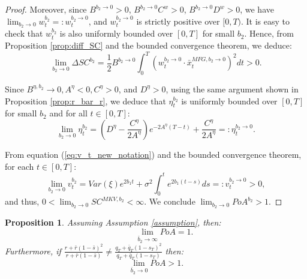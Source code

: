 \documentclass[11pt]{article}
\newtheorem{proposition}{Proposition}
\begin{document}
\begin{proof}
	
	Moreover, since $B^{b_2 \to 0}>0$, $B^{b_2 \to 0}C^w >0$, $B^{b_2\to 0}D^w > 0$, we have $\lim_{b_2 \to 0} w_t^{b_2}=:w_t^{b_2 \to 0}$, and $w_t^{b_2 \to 0}$ is strictly positive over $[0,T)$. It is easy to check that $w_t^{b_2}$ is also uniformly bounded over $[0,T]$ for small $b_2$. Hence, from Proposition \ref{prop:diff_SC} and the bounded convergence theorem, we deduce:
	\begin{equation*}
	\lim_{b_2 \to 0} \Delta SC^{b_2} = \frac{1}{2} B^{b_2\to 0} \int_0^T (w_t^{b_2 \to 0} \cdot \bar{x}_t^{MFG,b_2 \to 0})^2 dt >0.
	\end{equation*}
	
	
	Since $B^{\eta,b_2} \to 0, A^{\eta} < 0, C^{\eta} >0$, and $D^{\eta} > 0$, using the same argument shown in Proposition \ref{prop:r_bar_r}, 
	we deduce that $\eta_t^{b_2}$ is uniformly bounded over $[0,T]$ for small $b_2$ and for all $t \in[0,T]$:
	$$\lim_{b_2 \to 0}\eta_t^{b_2}=\left(D^{\eta} - \frac{C^{\eta}}{2A^\eta}\right) e^{-2A^\eta(T-t)} + \frac{C^\eta}{2A^{\eta} }=:\eta_t^{b_2 \to 0}.$$
	
	From equation (\ref{eq:v_t_new_notation}) and the bounded convergence theorem, for each $t \in [0,T]$:
	$$ \lim_{b_2 \to 0}v_t^{b_2}=Var(\xi) e^{2b_1 t} + \sigma^2 \int_0^t e^{2b_1 (t-s)} ds=:v_t^{b_2 \to 0}>0,$$
	and thus, $ 0 < \lim_{b_2 \to 0} SC^{MKV,b_2} < \infty.$ We conclude $\lim_{b_2 \to 0} PoA^{b_2} > 1.$
\end{proof}


\begin{proposition}
	Assuming Assumption \ref{assumption}, then:
	$$ \qquad\lim_{\bar{b}_2 \to \infty} PoA = 1.$$
	Furthermore, if	$\frac{r + \bar{r}(1- \bar{s})^2}{r + \bar{r}(1-\bar{s})} \neq \frac{q_T+\bar{q}_T(1-s_T)^2}{q_T+\bar{q}_T(1-s_T)}$ then:
	\begin{equation*}
	\lim_{\bar{b}_2 \to 0} PoA > 1. 
	\end{equation*}	
	\label{prop:b2bar}
\end{proposition}
\end{document}
